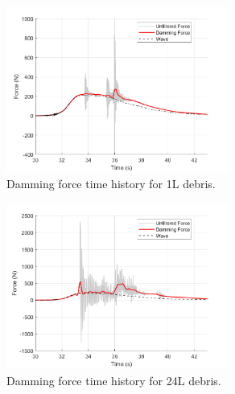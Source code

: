 \documentclass{article}
\begin{document}
\begin{figure}[h!]
    \centering
    \includegraphics[width=0.65\textwidth]{Reg_Lift_U_1_L_D__Masters_NHERIDeprisImpact2_goodtests_Reg_Lift_U_1_L_Trial04_Damming.png}
    \caption{Damming force time history for 1L debris.}
    \label{fig:timehist_1L_damming}
\end{figure}

\begin{figure}[h!]
    \centering
    \includegraphics[width=0.65\textwidth]{Reg_Lift_U_24_L_D__Masters_NHERIDeprisImpact2_goodtests_Reg_Lift_U_24_L_Trial04_Damming.png}
    \caption{Damming force time history for 24L debris.}
    \label{fig:timehist_24L_damming}
\end{figure}
\end{document}
